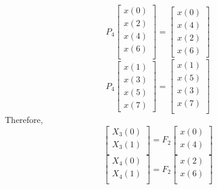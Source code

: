 \documentclass[journal,12pt,twocolumn]{IEEEtran}
\renewcommand\thesection{\arabic{section}}
\begin{document}
\begin{enumerate}[label=\thesection.\arabic*]
\begin{enumerate}[label=\arabic*.,ref=\thesection.\theenumi]
\begin{equation}
	\end{equation}
	\begin{equation}
		P_{4}
		\begin{bmatrix}
			x(0) \\ 
			x(2) \\ 
			x(4) \\ 
			x(6) \\
		\end{bmatrix}
		= 
		\begin{bmatrix}
			x(0) \\ 
			x(4) \\ 
			x(2) \\
			x(6)
		\end{bmatrix}
	\end{equation}
	\begin{equation}
		P_{4}
		\begin{bmatrix}
			x(1) \\ 
			x(3) \\ 
			x(5) \\
			x(7)
		\end{bmatrix}
		= 
		\begin{bmatrix}
			x(1) \\ 
			x(5) \\ 
			x(3) \\ 
			x(7) \\
		\end{bmatrix}
	\end{equation}
	Therefore,
	\begin{equation}
		\begin{bmatrix}
			X_{3}(0) \\ 
			X_{3}(1)\\ 
		\end{bmatrix}
		= F_{2}
		\begin{bmatrix}
			x(0) \\ 
			x(4) \\ 
		\end{bmatrix}
	\end{equation}
	\begin{equation}
		\begin{bmatrix}
			X_{4}(0) \\ 
			X_{4}(1)\\ 
		\end{bmatrix}
		= F_{2}
		\begin{bmatrix}
			x(2) \\ 
			x(6) \\ 
		\end{bmatrix}
	\end{equation}

\end{enumerate}
\end{enumerate}
\end{document}
